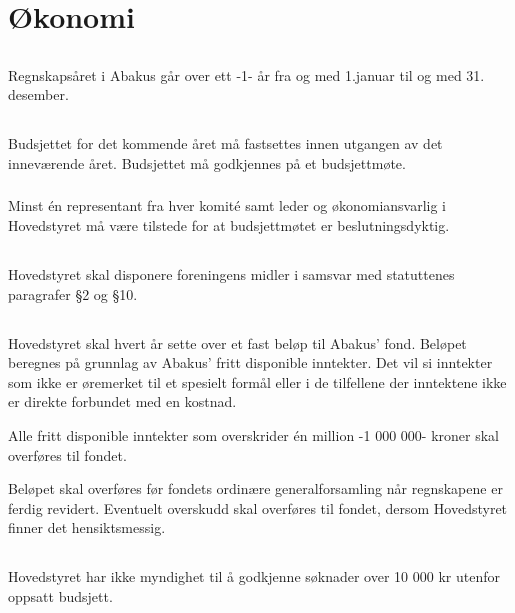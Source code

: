 \section{Økonomi}

\subsection{}
Regnskapsåret i Abakus går over ett -1- år fra og med 1.januar til og med 31. desember.

\subsection{}
\subsubsection{}
Budsjettet for det kommende året må fastsettes innen utgangen av det inneværende året. Budsjettet må godkjennes på et budsjettmøte.

\subsubsection{}
Minst én representant fra hver komité samt leder og økonomiansvarlig i Hovedstyret må være tilstede for at budsjettmøtet er beslutningsdyktig.

\subsection{}
Hovedstyret skal disponere foreningens midler i samsvar med statuttenes
paragrafer §2 og §10.

\subsection{}
Hovedstyret skal hvert år sette over et fast beløp til Abakus' fond. Beløpet
beregnes på grunnlag av Abakus' fritt disponible inntekter. Det vil si
inntekter som ikke er øremerket til et spesielt formål eller i de tilfellene
der inntektene ikke er direkte forbundet med en kostnad.

Alle fritt disponible inntekter som overskrider én million -1 000 000- kroner
skal overføres til fondet.

Beløpet skal overføres før fondets ordinære generalforsamling når regnskapene
er ferdig revidert. Eventuelt overskudd skal overføres til fondet, dersom
Hovedstyret finner det hensiktsmessig.

\subsection{}
Hovedstyret har ikke myndighet til å godkjenne søknader over 10 000 kr utenfor
oppsatt budsjett.

